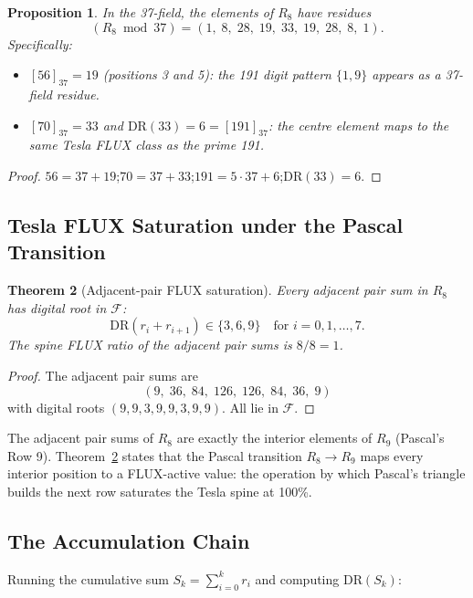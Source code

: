 \documentclass[12pt]{article}
\newtheorem{theorem}{Theorem}[section]
\newtheorem{proposition}[theorem]{Proposition}
\begin{document}
\begin{proposition}
\label{prop:pascal191}
In the 37-field, the elements of $R_8$ have residues
\[
    (R_8 \bmod 37) = (1,\;8,\;28,\;19,\;33,\;19,\;28,\;8,\;1).
\]
Specifically:
\begin{itemize}
\item $[56]_{37} = 19$ (positions 3 and 5): the 191 digit pattern $\{1,9\}$
      appears as a 37-field residue.
\item $[70]_{37} = 33$ and $\mathrm{DR}(33) = 6 = [191]_{37}$: the centre
      element maps to the same Tesla FLUX class as the prime 191.
\end{itemize}
\end{proposition}

\begin{proof}
$56 = 37+19$;\quad $70 = 37+33$;\quad $191 = 5\cdot37+6$;\quad $\mathrm{DR}(33)=6$.
\end{proof}

\subsection{Tesla FLUX Saturation under the Pascal Transition}

\begin{theorem}[Adjacent-pair FLUX saturation]
\label{thm:pascal_flux}
Every adjacent pair sum in $R_8$ has digital root in $\mathcal{F}$:
\[
    \mathrm{DR}(r_i + r_{i+1}) \in \{3,6,9\}
    \quad \text{for } i = 0,1,\ldots,7.
\]
The spine FLUX ratio of the adjacent pair sums is $8/8 = 1$.
\end{theorem}

\begin{proof}
The adjacent pair sums are
\[
    (9,\;36,\;84,\;126,\;126,\;84,\;36,\;9)
\]
with digital roots $(9,9,3,9,9,3,9,9)$.  All lie in $\mathcal{F}$.
\end{proof}

The adjacent pair sums of $R_8$ are exactly the interior elements of $R_9$
(Pascal's Row 9).  Theorem~\ref{thm:pascal_flux} states that the Pascal
transition $R_8 \to R_9$ maps every interior position to a FLUX-active value:
the operation by which Pascal's triangle builds the next row saturates the
Tesla spine at 100\%.

\subsection{The Accumulation Chain}

Running the cumulative sum $S_k = \sum_{i=0}^{k} r_i$ and computing
$\mathrm{DR}(S_k)$:
\end{document}
